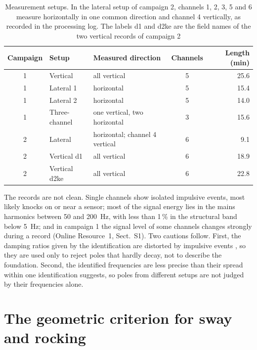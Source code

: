 \documentclass[11pt]{article}
\begin{document}
\begin{table}[htbp]
\centering
\caption{Measurement setups. In the lateral setup of campaign 2, channels 1, 2, 3, 5 and 6 measure horizontally in one common direction and channel 4 vertically, as recorded in the processing log. The labels d1 and d2ke are the field names of the two vertical records of campaign 2}
\label{tab:setups}
\begin{tabular}{@{}cllcr@{}}
\toprule
Campaign & Setup & Measured direction & Channels & Length (min) \\
\midrule
1 & Vertical       & all vertical                   & 5 & 25.6 \\
1 & Lateral 1      & horizontal                     & 5 & 15.4 \\
1 & Lateral 2      & horizontal                     & 5 & 14.0 \\
1 & Three-channel  & one vertical, two horizontal   & 3 & 15.6 \\
2 & Lateral        & horizontal; channel 4 vertical & 6 & 9.1 \\
2 & Vertical d1    & all vertical                   & 6 & 18.9 \\
2 & Vertical d2ke  & all vertical                   & 6 & 22.8 \\
\bottomrule
\end{tabular}
\end{table}

The records are not clean. Single channels show isolated impulsive events, most likely knocks on or near a sensor; most of the signal energy lies in the mains harmonics between 50 and 200~Hz, with less than 1\,\% in the structural band below 5~Hz; and in campaign 1 the signal level of some channels changes strongly during a record (Online Resource~1, Sect.~S1). Two cautions follow. First, the damping ratios given by the identification are distorted by impulsive events \cite{nord2019}, so they are used only to reject poles that hardly decay, not to describe the foundation. Second, the identified frequencies are less precise than their spread within one identification suggests, so poles from different setups are not judged by their frequencies alone.

\section{The geometric criterion for sway and rocking}
\label{sec:model}
\end{document}
